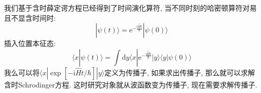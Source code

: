         我们基于含时薛定谔方程已经得到了时间演化算符, 当不同时刻的哈密顿算符对易且不显含时间时:
        \begin{equation}
            | \psi(t) \rangle = \mathrm{e}^{-\frac {\mathrm{i}\hat{H}t}{\hbar}} | \psi(0) \rangle
        \end{equation}
        插入位置本征态:
        \begin{equation}
            \langle x | \psi(t) \rangle = \int \mathrm{d} y \langle x | \mathrm{e}^{-\frac {\mathrm{i}\hat{H}t}{\hbar}} | y \rangle  \langle y | \psi(0) \rangle
        \end{equation}
        我么可以将$\langle x | \exp[-\mathrm{i}\hat{H}t / \hbar] | y \rangle$定义为传播子, 如果求出传播子, 那么就可以求解含时Schrodinger方程. 这时研究对象就从波函数变为传播子, 现在需要求解传播子. 

